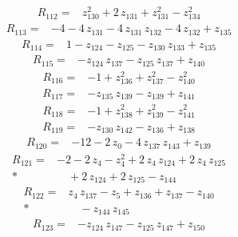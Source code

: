\documentclass[10pt]{article}
\begin{document}
\begin{align*}
R_{112}={}& z_{130}^{2} + 2\,z_{131} + z_{131}^{2} - z_{134}^{2}
\end{align*}
\begin{align*}
R_{113}={}& - 4 - 4\,z_{131} - 4\,z_{131}\,z_{132} - 4\,z_{132} + z_{135}
\end{align*}
\begin{align*}
R_{114}={}& 1 - z_{124} - z_{125} - z_{130}\,z_{133} + z_{135}
\end{align*}
\begin{align*}
R_{115}={}& - z_{124}\,z_{137} - z_{125}\,z_{137} + z_{140}
\end{align*}
\begin{align*}
R_{116}={}& - 1 + z_{136}^{2} + z_{137}^{2} - z_{140}^{2}
\end{align*}
\begin{align*}
R_{117}={}& - z_{135}\,z_{139} - z_{139} + z_{141}
\end{align*}
\begin{align*}
R_{118}={}& - 1 + z_{138}^{2} + z_{139}^{2} - z_{141}^{2}
\end{align*}
\begin{align*}
R_{119}={}& - z_{130}\,z_{142} - z_{136} + z_{138}
\end{align*}
\begin{align*}
R_{120}={}& - 12 - 2\,z_{0} - 4\,z_{137}\,z_{143} + z_{139}
\end{align*}
\begin{align*}
R_{121}={}& - 2 - 2\,z_{4} - z_{4}^{2} + 2\,z_{4}\,z_{124} + 2\,z_{4}\,z_{125} \\*
&\quad + 2\,z_{124} + 2\,z_{125} - z_{144}
\end{align*}
\begin{align*}
R_{122}={}& z_{4}\,z_{137} - z_{5} + z_{136} + z_{137} - z_{140} \\*
&\quad - z_{144}\,z_{145}
\end{align*}
\begin{align*}
R_{123}={}& - z_{124}\,z_{147} - z_{125}\,z_{147} + z_{150}
\end{align*}
\end{document}
